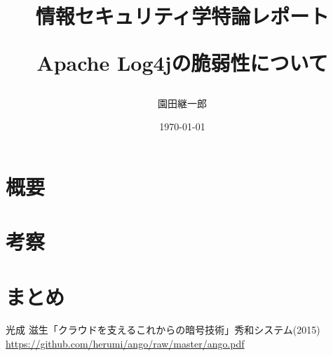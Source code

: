 \documentclass[a4paper,11pt]{jsarticle}
\begin{document}
\title{{\Large 情報セキュリティ学特論レポート}

Apache Log4jの脆弱性について}
\author{園田継一郎}
\date{\today}
\maketitle

\section{概要}

\section{考察}

\section{まとめ}

\begin{thebibliography}{99}
  光成 滋生「クラウドを支えるこれからの暗号技術」秀和システム(2015) \url{https://github.com/herumi/ango/raw/master/ango.pdf}
\end{thebibliography}
\end{document}
